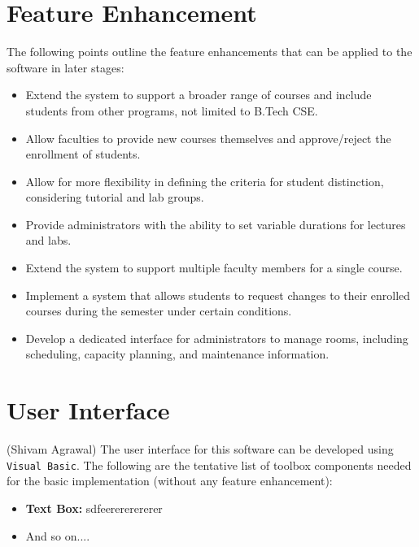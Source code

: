 \documentclass[12pt,a4paper]{article}
\begin{document}
\section{Feature Enhancement}
The following points outline the feature enhancements that can be applied to the software in later stages:
\begin{itemize}
    \item Extend the system to support a broader range of courses and include students from other programs, not limited to B.Tech CSE.
    \item Allow faculties to provide new courses themselves and approve/reject the enrollment of students.
    \item Allow for more flexibility in defining the criteria for student distinction, considering tutorial and lab groups.
    \item Provide administrators with the ability to set variable durations for lectures and labs.
    \item Extend the system to support multiple faculty members for a single course.
    \item Implement a system that allows students to request changes to their enrolled courses during the semester under certain conditions.
    \item Develop a dedicated interface for administrators to manage rooms, including scheduling, capacity planning, and maintenance information.
\end{itemize}
        
\section{User Interface}
(Shivam Agrawal)
	The user interface for this software can be developed using \texttt{Visual Basic}. The following are the tentative list of toolbox components needed for the basic implementation (without any feature enhancement):
    \begin{itemize}
        \item \textbf{Text Box:} sdfeerererererer
        \item And so on....
    \end{itemize}
\end{document}
